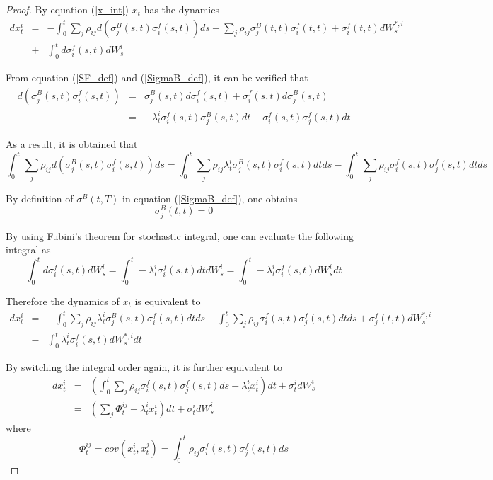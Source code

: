 \documentclass[10pt]{article}
\theoremstyle{plain}
\numberwithin{equation}{section}
\numberwithin{table}{section}
\newcommand{\prt}[1]{\left( #1 \right)}  %
\begin{document}
\begin{proof}
    By equation (\ref{x_int}) $x_{t}$ has the dynamics
\begin{eqnarray*}
    dx_{t}^{i}&=&-\int_{0}^{t}\underset{j}{\sum }\rho _{ij}d(\sigma
    _{j}^{B}(s,t)\sigma _{i}^{f}(s,t))ds-\underset{j}{\sum }\rho _{ij}\sigma
    _{j}^{B}(t,t)\sigma _{i}^{f}(t,t)+\sigma _{i}^{f}(t,t)dW_{s}^{\ast ,i} \\
            &+&\int_{0}^{t}d\sigma _{i}^{f}(s,t)dW_{s}^{i}
\end{eqnarray*}

From equation (\ref{SF_def}) and (\ref{SigmaB_def}), it can be verified that
\begin{eqnarray*}
    d(\sigma _{j}^{B}(s,t)\sigma _{i}^{f}(s,t)) &=&\sigma _{j}^{B}(s,t)d\sigma
    _{i}^{f}(s,t)+\sigma _{i}^{f}(s,t)d\sigma _{j}^{B}(s,t) \\
    &=& -\lambda _{t}^{i}\sigma _{i}^{f}(s,t)\sigma _{j}^{B}(s,t)dt-\sigma
    _{i}^{f}(s,t)\sigma _{j}^{f}(s,t)dt
\end{eqnarray*}

As a result, it is obtained that
\[
    \int_{0}^{t}\underset{j}{\sum }\rho _{ij}d(\sigma _{j}^{B}(s,t)\sigma
    _{i}^{f}(s,t))ds = \int_{0}^{t}\underset{j}{\sum }\rho _{ij}\lambda
    _{t}^{i}\sigma _{j}^{B}(s,t)\sigma _{i}^{f}(s,t)dtds-\int_{0}^{t}\underset{j}
    {\sum }\rho _{ij}\sigma _{i}^{f}(s,t)\sigma _{j}^{f}(s,t)dtds
\]

By definition of $\sigma^{B}(t,T)$ in equation (\ref{SigmaB_def}), one
obtains
\[
    \sigma _{j}^{B}(t,t)=0
\]

By using Fubini's theorem for stochastic integral, one can evaluate the
following integral as
\[
    \int_{0}^{t}d\sigma _{i}^{f}(s,t)dW_{s}^{i}=\int_{0}^{t}-\lambda
    _{t}^{i}\sigma _{i}^{f}(s,t)dtdW_{s}^{i}=\int_{0}^{t}-\lambda _{t}^{i}\sigma
    _{i}^{f}(s,t)dW_{s}^{i}dt
\]

Therefore the dynamics of $x_{t}$ is equivalent to
\begin{eqnarray*}
    dx_{t}^{i}&=&-\int_{0}^{t}\underset{j}{\sum }\rho _{ij}\lambda
    _{t}^{i}\sigma _{j}^{B}(s,t)\sigma _{i}^{f}(s,t)dtds+\int_{0}^{t}\underset{j}
    {\sum }\rho _{ij}\sigma _{i}^{f}(s,t)\sigma _{j}^{f}(s,t)dtds+\sigma
    _{j}^{f}(t,t)dW_{s}^{\ast ,i} \\
    &-&\int_{0}^{t}\lambda _{t}^{i}\sigma _{i}^{f}(s,t)dW_{s}^{\ast ,i}dt
\end{eqnarray*}

By switching the integral order again, it is further equivalent to
\begin{eqnarray*}
    dx_{t}^{i}&=& \prt{\int_{0}^{t}\underset{j}{\sum }\rho _{ij}\sigma
    _{i}^{f}(s,t)\sigma _{j}^{f}(s,t)ds-\lambda _{t}^{i}x_{t}^{i}}dt+\sigma
    _{t}^{i}dW_{s}^{i} \\
    &=&(\underset{j}{\sum }\Phi _{t}^{ij}-\lambda _{t}^{i}x_{t}^{i})dt+\sigma
    _{t}^{i}dW_{s}^{i}
\end{eqnarray*}
where
\[
    \Phi _{t}^{ij}=cov(x_{t}^{i},x_{t}^{j})=\int_{0}^{t}\rho _{ij}\sigma
    _{i}^{f}(s,t)\sigma _{j}^{f}(s,t)ds   
\]
\end{proof}
\end{document}
